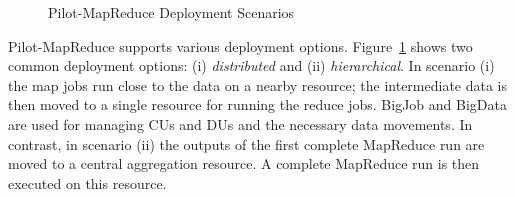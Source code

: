 \documentclass{acm_proc_article-sp}
\newcommand{\pilotmapreduce}{Pilot-MapReduce\xspace}
\begin{document}
\begin{figure}
	\centering
	\caption{\pilotmapreduce Deployment 
	Scenarios\label{fid:distributed-mapreduce-overview}}
\end{figure}


\pilotmapreduce supports various deployment options.
Figure~\ref{fid:distributed-mapreduce-overview} shows two common deployment
options: (i) \emph{distributed} and (ii) \emph{hierarchical}. In scenario (i)
the map jobs run close to the data on a nearby resource; the intermediate data
is then moved to a single resource for running the reduce jobs. BigJob and
BigData are used for managing CUs and DUs and the necessary data movements. In
contrast, in scenario (ii) the outputs of the first complete MapReduce run are
moved to a central aggregation resource. A complete MapReduce run is then
executed on this resource.


\end{document}
